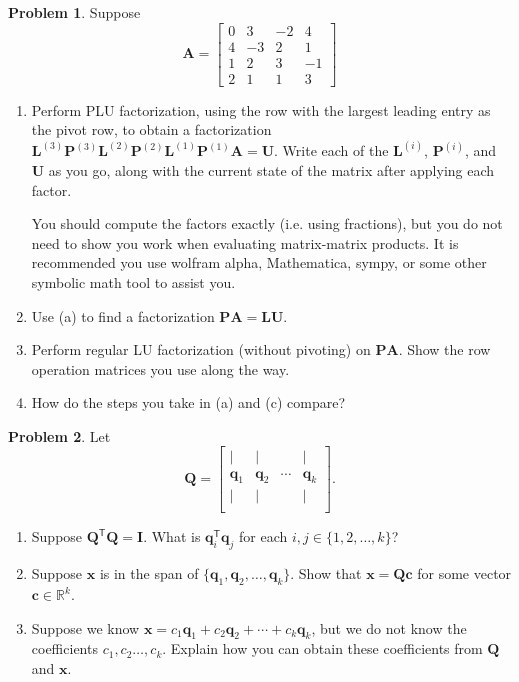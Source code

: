 \documentclass[12pt]{article}
\theoremstyle{definition}
\newtheorem{problem}{Problem}
\renewcommand{\vec}{\mathbf}
\newcommand{\T}{\mathsf{T}}
\begin{document}
\begin{problem}
Suppose
    \[
        \vec{A} 
        = 
        \begin{bmatrix}
            0 & 3 & -2 & 4 \\
            4 & -3 & 2 & 1 \\
            1 & 2 & 3 & -1 \\
            2 & 1 & 1& 3
        \end{bmatrix}
    \]

    \begin{enumerate}
        \item Perform PLU factorization, using the row with the largest leading entry as the pivot row, to obtain a factorization $\vec{L}^{(3)} \vec{P}^{(3)} \vec{L}^{(2)} \vec{P}^{(2)} \vec{L}^{(1)} \vec{P}^{(1)} \vec{A} = \vec{U}$.
        Write each of the $\vec{L}^{(i)}$, $\vec{P}^{(i)}$, and $\vec{U}$ as you go, along with the current state of the matrix after applying each factor.
            
            You should compute the factors exactly (i.e. using fractions), but you do not need to show you work when evaluating matrix-matrix products. It is recommended you use wolfram alpha, Mathematica, sympy, or some other symbolic math tool to assist you.  
        \item Use (a) to find a factorization $\vec{P}\vec{A}  = \vec{L} \vec{U}$.
        \item Perform regular LU factorization (without pivoting) on $\vec{P}\vec{A}$.
            Show the row operation matrices you use along the way.
        \item How do the steps you take in (a) and (c) compare?
    \end{enumerate}
\end{problem}


\begin{problem}
Let 
\[
\vec{Q} = \begin{bmatrix}
|&|&&| \\
\vec{q}_1 & \vec{q}_2 & \cdots & \vec{q}_k \\
|&|&&| \\
\end{bmatrix}.
\]

\begin{enumerate}
    \item Suppose $\vec{Q}^\T \vec{Q} = \vec{I}$. 
        What is $\vec{q}_i^\T\vec{q}_j$ for each $i,j \in \{1,2,\ldots, k\}$?
    \item Suppose $\vec{x}$ is in the span of $\{\vec{q}_1, \vec{q}_2, \ldots, \vec{q}_k\}$. Show that $\vec{x} = \vec{Q}\vec{c}$ for some vector $\vec{c}\in\mathbb{R}^k$.
    \item Suppose we know $\vec{x} = c_1 \vec{q}_1 + c_2 \vec{q}_2 + \cdots + c_k \vec{q}_k$, but we do not know the coefficients $c_1, c_2 \ldots, c_k$. 
       Explain how you can obtain these coefficients from $\vec{Q}$ and $\vec{x}$.
\end{enumerate}

\end{problem}
\end{document}
